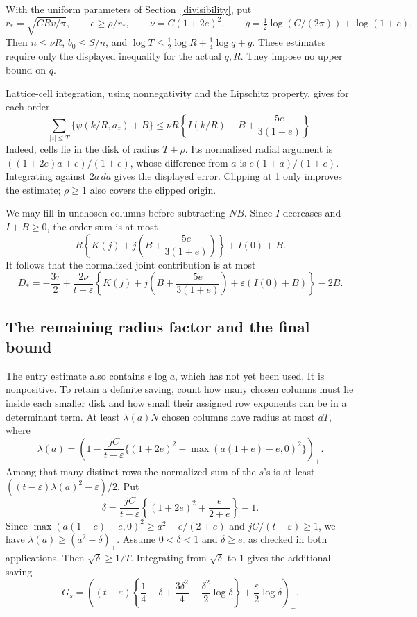 \documentclass[11pt]{article}
\begin{document}
With the uniform parameters of Section~\ref{divisibility}, put
\begin{equation}\label{geometry}
 r_* =\sqrt{CRv/\pi},\qquad e\ge\rho/r_*,\qquad
 \nu=C(1+2e)^2,\qquad
 g=\tfrac12\log(C/(2\pi))+\log(1+e).
\end{equation}
Then \(n\le\nu R\), \(b_0\le S/n\), and
\(\log T\le\frac12\log R+\frac14\log q+g\).
These estimates require only the displayed inequality for the actual
\(q,R\). They impose no upper bound on \(q\).

Lattice-cell integration, using nonnegativity and the Lipschitz property,
gives for each order
\[
 \sum_{|z|\le T}\{\psi(k/R,a_z)+B\}
 \le\nu R\left\{I(k/R)+B+\frac{5e}{3(1+e)}\right\}.
\]
Indeed, cells lie in the disk of radius \(T+\rho\). Its normalized
radial argument is \(((1+2e)a+e)/(1+e)\), whose difference from
\(a\) is \(e(1+a)/(1+e)\). Integrating against \(2a\,da\) gives
the displayed error. Clipping at 1 only improves the estimate;
\(\rho\ge1\) also covers the clipped origin.

We may fill in unchosen columns before subtracting \(NB\).
Since \(I\) decreases and \(I+B\ge0\), the order sum is at most
\[
 R\left\{K(j)+j\left(B+\frac{5e}{3(1+e)}\right)\right\}+I(0)+B.
\]
It follows that the normalized joint contribution is at most
\begin{equation}\label{Djoint}
 D_*=-\frac{3\tau}2+
 \frac{2\nu}{t-\varepsilon}
 \left\{K(j)+j\left(B+\frac{5e}{3(1+e)}\right)
                  +\varepsilon(I(0)+B)\right\}-2B.
\end{equation}

\subsection{The remaining radius factor and the final bound}
The entry estimate also contains \(s\log a\), which has not yet been
used. It is nonpositive. To retain a definite saving, count how many
chosen columns must lie inside each smaller disk and how small their
assigned row exponents can be in a determinant term.
At least \(\lambda(a)N\) chosen columns have radius at most \(aT\), where
\[
 \lambda(a)=\left(1-\frac{jC}{t-\varepsilon}
   \{(1+2e)^2-\max(a(1+e)-e,0)^2\}\right)_+.
\]
Among that many distinct rows the normalized sum of the \(s\)'s is
at least \(((t-\varepsilon)\lambda(a)^2-\varepsilon)/2\).
Put
\[
 \delta=\frac{jC}{t-\varepsilon}
       \left\{(1+2e)^2+\frac e{2+e}\right\}-1.
\]
Since \(\max(a(1+e)-e,0)^2\ge a^2-e/(2+e)\) and
\(jC/(t-\varepsilon)\ge1\), we have
\(\lambda(a)\ge(a^2-\delta)_+\).
Assume \(0<\delta<1\) and \(\delta\ge e\), as checked in both applications. Then
\(\sqrt\delta\ge1/T\). Integrating from \(\sqrt\delta\) to 1 gives
the additional saving
\begin{equation}\label{Gs}
 G_s=\left((t-\varepsilon)
       \left\{\frac14-\delta+\frac{3\delta^2}4
                    -\frac{\delta^2}2\log\delta\right\}
                     +\frac\varepsilon2\log\delta\right)_+.
\end{equation}
\end{document}
